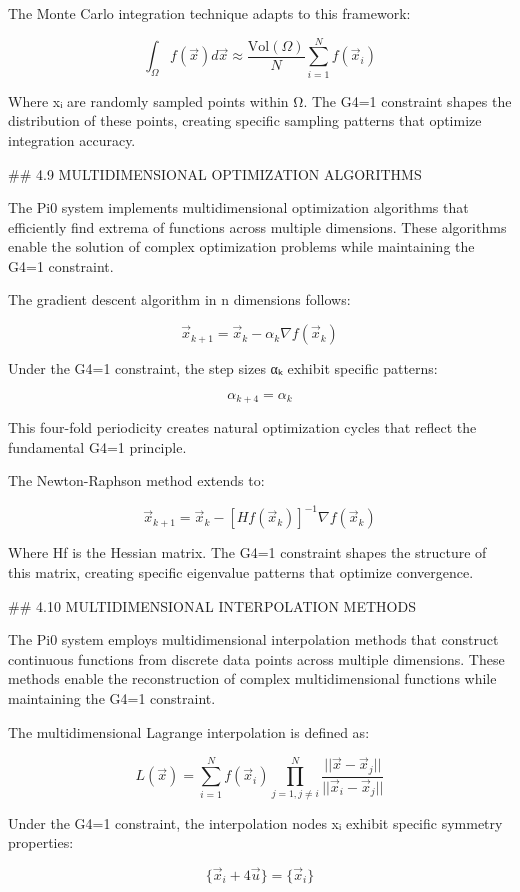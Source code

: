 The Monte Carlo integration technique adapts to this framework:

$$\int_{\Omega} f(\vec{x}) d\vec{x} \approx \frac{\text{Vol}(\Omega)}{N} \sum_{i=1}^N f(\vec{x}_i)$$

Where x⃗ᵢ are randomly sampled points within Ω. The G4=1 constraint shapes the distribution of these points, creating specific sampling patterns that optimize integration accuracy.

## 4.9 MULTIDIMENSIONAL OPTIMIZATION ALGORITHMS

The Pi0 system implements multidimensional optimization algorithms that efficiently find extrema of functions across multiple dimensions. These algorithms enable the solution of complex optimization problems while maintaining the G4=1 constraint.

The gradient descent algorithm in n dimensions follows:

$$\vec{x}_{k+1} = \vec{x}_k - \alpha_k \nabla f(\vec{x}_k)$$

Under the G4=1 constraint, the step sizes αₖ exhibit specific patterns:

$$\alpha_{k+4} = \alpha_k$$

This four-fold periodicity creates natural optimization cycles that reflect the fundamental G4=1 principle.

The Newton-Raphson method extends to:

$$\vec{x}_{k+1} = \vec{x}_k - [Hf(\vec{x}_k)]^{-1} \nabla f(\vec{x}_k)$$

Where Hf is the Hessian matrix. The G4=1 constraint shapes the structure of this matrix, creating specific eigenvalue patterns that optimize convergence.

## 4.10 MULTIDIMENSIONAL INTERPOLATION METHODS

The Pi0 system employs multidimensional interpolation methods that construct continuous functions from discrete data points across multiple dimensions. These methods enable the reconstruction of complex multidimensional functions while maintaining the G4=1 constraint.

The multidimensional Lagrange interpolation is defined as:

$$L(\vec{x}) = \sum_{i=1}^N f(\vec{x}_i) \prod_{j=1, j \neq i}^N \frac{||\vec{x} - \vec{x}_j||}{||\vec{x}_i - \vec{x}_j||}$$

Under the G4=1 constraint, the interpolation nodes x⃗ᵢ exhibit specific symmetry properties:

$$\{\vec{x}_i + 4\vec{u}\} = \{\vec{x}_i\}$$

